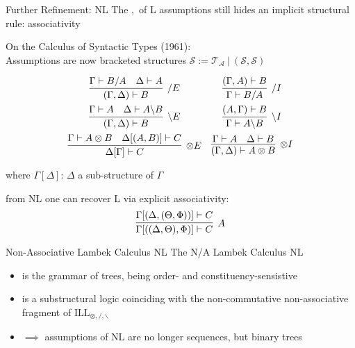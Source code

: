\documentclass{beamer}
\begin{document}
\begin{frame}{Further Refinement: NL}
	\small
	The $,$ of L assumptions still hides an implicit structural rule:
	\pause
	associativity
	\vfill

	\alert{On the Calculus of Syntactic Types (1961)}:\\
	
	Assumptions are now bracketed structures $\mathcal{S} := \mathcal{T}_\mathcal{A} \ | \ (\mathcal{S}, \mathcal{S})$
	\pause
		
	\[
	\begin{array}{cc}
		\vcenter{\infer[/ E]{(\Gamma, \Delta) \vdash B}{\Gamma \vdash B/A & \Delta \vdash A}}
		&
		\vspace{5pt}
		\vcenter{\infer[/ I]{\Gamma \vdash B/A}{(\Gamma, A) \vdash B}} \\		\vcenter{\infer[\backslash E]{(\Gamma, \Delta) \vdash B}{\Gamma \vdash A & \Delta \vdash A\backslash B}}
		\vspace{5pt}
		&
		\vcenter{\infer[\backslash I]{\Gamma \vdash A\backslash B}{(A, \Gamma) \vdash B}} \\
		\vcenter{\infer[\otimes E]{\Delta[\Gamma] \vdash C}{
			\Gamma \vdash A\otimes B
			&
			\Delta[(A, B)] \vdash C
		}}
		&
		\vcenter{\infer[\otimes I]{(\Gamma, \Delta) \vdash A\otimes B}{
			\Gamma \vdash A 
			&
			\Delta \vdash B
			}} \\
	\end{array}
	\]
	\begin{flushright}
		where $\Gamma[\Delta]$: $\Delta$ a sub-structure of $\Gamma$	
	\end{flushright}
	
	
	from NL one can recover L via explicit associativity:
	\[
		\infer[A]{\Gamma[((\Delta, \Theta), \Phi)] \vdash C}{
		\Gamma[(\Delta, (\Theta, \Phi))] \vdash C
		}
	\]
	\end{frame}

\begin{frame}{Non-Associative Lambek Calculus NL}
	\small
	\alert{The N/A Lambek Calculus NL}\\
	\begin{itemize}
	\item is the grammar of \alert{trees}, being order- and constituency-sensistive
	\item is a substructural logic coinciding with the non-commutative non-associative fragment of $\text{ILL}_{\otimes, /, \backslash}$
	\item[] $\implies$ assumptions of NL are no longer sequences, but \alert{binary trees}
	\end{itemize}
\end{frame}
\end{document}
